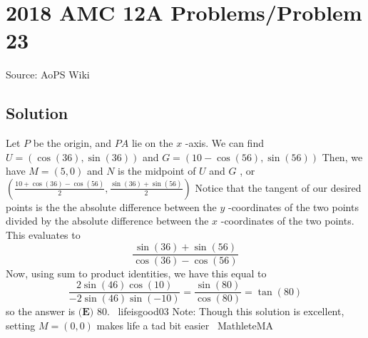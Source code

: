 \documentclass[12pt]{article}
\begin{document}
\section*{{2018 AMC 12A Problems/Problem 23}}
Source: AoPS Wiki

\subsection*{Solution}
Let $P$ be the origin, and $PA$ lie on the $x$ -axis. We can find $U=\left(\cos(36), \sin(36)\right)$ and $G=\left(10-\cos(56), \sin(56)\right)$ Then, we have $M=(5, 0)$ and $N$ is the midpoint of $U$ and $G$ , or $\left(\frac{10+\cos(36)-\cos(56)}{2}, \frac{\sin(36)+\sin(56)}{2}\right)$ Notice that the tangent of our desired points is the the absolute difference between the $y$ -coordinates of the two points divided by the absolute difference between the $x$ -coordinates of the two points. This evaluates to \[\frac{\sin(36)+\sin(56)}{\cos(36)-\cos(56)}\] Now, using sum to product identities, we have this equal to \[\frac{2\sin(46)\cos(10)}{-2\sin(46)\sin({-10})}=\frac{\sin(80)}{\cos(80)}=\tan(80)\] so the answer is $\boxed{\textbf{(E) } 80}.$ ~lifeisgood03 Note: Though this solution is excellent, setting $M = (0,0)$ makes life a tad bit easier ~MathleteMA
\end{document}
